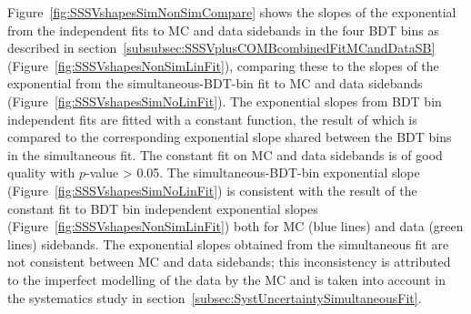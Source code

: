 Figure~\ref{fig:SSSVshapesSimNonSimCompare} shows the slopes of the exponential from the independent fits to \bbmumuX MC and data sidebands in the four BDT bins as described in section~\ref{subsubsec:SSSVplusCOMBcombinedFitMCandDataSB} (Figure~\ref{fig:SSSVshapesNonSimLinFit}), comparing these to the slopes of the exponential from the simultaneous-BDT-bin fit to \bbmumuX MC and data sidebands (Figure~\ref{fig:SSSVshapesSimNoLinFit}). The exponential slopes from BDT bin independent fits are fitted with a constant function, the result of which is compared to the corresponding exponential slope shared between the BDT bins in the simultaneous fit. The constant fit on MC and data sidebands is of good quality with $p$-value > 0.05. The simultaneous-BDT-bin exponential slope (Figure~\ref{fig:SSSVshapesSimNoLinFit}) is consistent with the result of the constant fit to BDT bin independent exponential slopes (Figure~\ref{fig:SSSVshapesNonSimLinFit}) both for MC (blue lines) and data (green lines) sidebands. The exponential slopes obtained from the simultaneous fit are not consistent between MC and data sidebands; this inconsistency is attributed to the imperfect modelling of the data by the MC and is taken into account in the systematics study in section~\ref{subsec:SystUncertaintySimultaneousFit}.
